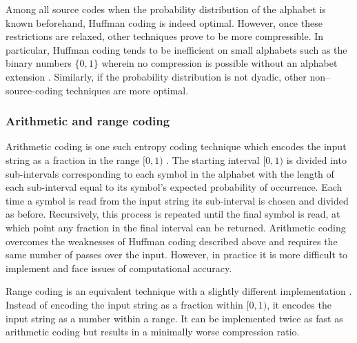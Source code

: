 Among all source codes when the probability distribution of the alphabet is known beforehand, Huffman coding is indeed optimal. However, once these restrictions are relaxed, other techniques prove to be more compressible. In particular, Huffman coding tends to be inefficient on small alphabets such as the binary numbers $\{0,1\}$ wherein no compression is possible without an alphabet extension \cite{arithmetic-coding}. Similarly, if the probability distribution is not dyadic, other non--source-coding techniques are more optimal.

\subsubsection{Arithmetic and range coding}
\label{sec:data:entropy:range}

Arithmetic coding is one such entropy coding technique which encodes the input string as a fraction in the range $[0,1)$ \cite{arithmetic-coding}. The starting interval $[0,1)$ is divided into sub-intervals corresponding to each symbol in the alphabet with the length of each sub-interval equal to its symbol's expected probability of occurrence. Each time a symbol is read from the input string its sub-interval is chosen and divided as before. Recursively, this process is repeated until the final symbol is read, at which point any fraction in the final interval can be returned. Arithmetic coding overcomes the weaknesses of Huffman coding described above and requires the same number of passes over the input. However, in practice it is more difficult to implement and face issues of computational accuracy.

Range coding is an equivalent technique with a slightly different implementation
\cite{range-coding}. Instead of encoding the input string as a fraction within
$[0,1)$, it encodes the input string as a number within a range.
It can be implemented twice as fast as arithmetic coding but
results in a minimally worse compression ratio.

